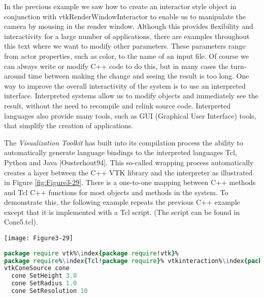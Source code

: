 \begin{description}[leftmargin=0cm,labelindent=0cm]
\item[Interpreted Code.]
\label{subsec:examples_interpreted_code}

In the previous example we saw how to create an interactor style object in conjunction with vtkRenderWindowInteractor to enable us to manipulate the camera by mousing in the render window. Although this provides flexibility and interactivity for a large number of applications, there are examples throughout this text where we want to modify other parameters. These parameters range from actor properties, such as color, to the name of an input file. Of course we can always write or modify C++ code to do this, but in many cases the turn-around time between making the change and seeing the result is too long. One way to improve the overall interactivity of the system is to use an interpreted interface. Interpreted systems allow us to modify objects and immediately see the result, without the need to recompile and relink source code. Interpreted languages also provide many tools, such as GUI (Graphical User Interface) tools, that simplify the creation of applications.

\begin{minipage}{.6\linewidth}
The \emph{Visualization Toolkit} has built into its compilation process the ability to automatically generate language bindings to the interpreted languages Tcl, Python and Java [Ousterhout94]. This so-called wrapping process automatically creates a layer between the C++ VTK library and the interpreter as illustrated in Figure \ref{fig:Figure3-29}. There is a one-to-one mapping between C++ methods and Tcl C++ functions for most objects and methods in the system. To demonstrate this, the following example repeats the previous C++ example except that it is implemented with a Tcl script. (The script can be found in Cone5.tcl).
\end{minipage}
\hfill
\begin{minipage}{.25\linewidth}
  \centering
  \texttt{[image: Figure3-29]} 
  \label{fig:Figure3-29}
\end{minipage}

\begin{lstlisting}[language=TCL, caption={Cone5.tcl}, escapechar=\% ]
package require vtk%\index{package require!vtk}%
package require%\index{Tcl!package require}% vtkinteraction%\index{package require!vtkinteraction}%
vtkConeSource cone
  cone SetHeight 3.0
  cone SetRadius 1.0
  cone SetResolution 10


\end{lstlisting}
\end{description}
